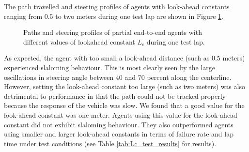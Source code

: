 %     


The path travelled and steering profiles of agents with look-ahead constants ranging from $0.5$ to two meters during one test lap are shown in Figure \ref{fig:lfc_paths}.
\begin{figure}[htb!]
    \centering
    
    \caption[Paths and steering profiles of agents with different values of $L_{c}$]{Paths and steering profiles of partial end-to-end agents with different values of lookahead constant $L_{c}$ during one test lap.}
    \label{fig:lfc_paths}
\end{figure}
As expected, the agent with too small a look-ahead distance (such as $0.5$ meters) experienced slaloming behaviour.
This is most clearly seen by the large oscillations in steering angle between $40$ and $70$ percent along the centerline.
However, setting the look-ahead constant too large (such as two meters) was also detrimental to performance in that the path could not be tracked properly because the response of the vehicle was slow.
We found that a good value for the look-ahead constant was one meter.
Agents using this value for the look-ahead constant did not exhibit slaloming behaviour.
They also outperformed agents using smaller and larger look-ahead constants in terms of failure rate and lap time under test conditions (see Table \ref{tab:Lc_test_results} for results).

%     

